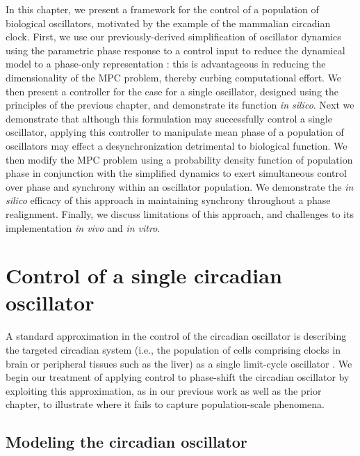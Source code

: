 In this chapter, we present a framework for the control of a population of biological oscillators, motivated by the example of the mammalian circadian clock.
First, we use our previously-derived simplification of oscillator dynamics using the parametric phase response to a control input to reduce the dynamical model to a phase-only representation \cite{Abel2016b}: this is advantageous in reducing the dimensionality of the MPC problem, thereby curbing computational effort.
We then present a controller for the case for a single oscillator, designed using the principles of the previous chapter, and demonstrate its function \textit{in silico}.
Next we demonstrate that although this formulation may successfully control a single oscillator, applying this controller to manipulate mean phase of a population of oscillators may effect a desynchronization detrimental to biological function.
We then modify the MPC problem using a probability density function of population phase in conjunction with the simplified dynamics to exert simultaneous control over phase and synchrony within an oscillator population.
We demonstrate the \textit{in silico} efficacy of this approach in maintaining synchrony throughout a phase realignment.
Finally, we discuss limitations of this approach, and challenges to its implementation \textit{in vivo} and \textit{in vitro}.


\section{Control of a single circadian oscillator}
\label{sec:single}
A standard approximation in the control of the circadian oscillator is describing the targeted circadian system (i.e., the population of cells comprising clocks in brain or peripheral tissues such as the liver) as a single limit-cycle oscillator \cite{Slaby2007, Bagheri2007, Shaik2008, Bagheri2008, Serkh2014, Zhang2016, Abel2016b, Abel2017a}.
We begin our treatment of applying control to phase-shift the circadian oscillator by exploiting this approximation, as in our previous work \cite{Abel2016b, Abel2017a} as well as the prior chapter, to illustrate where it fails to capture population-scale phenomena.

\subsection*{Modeling the circadian oscillator}


